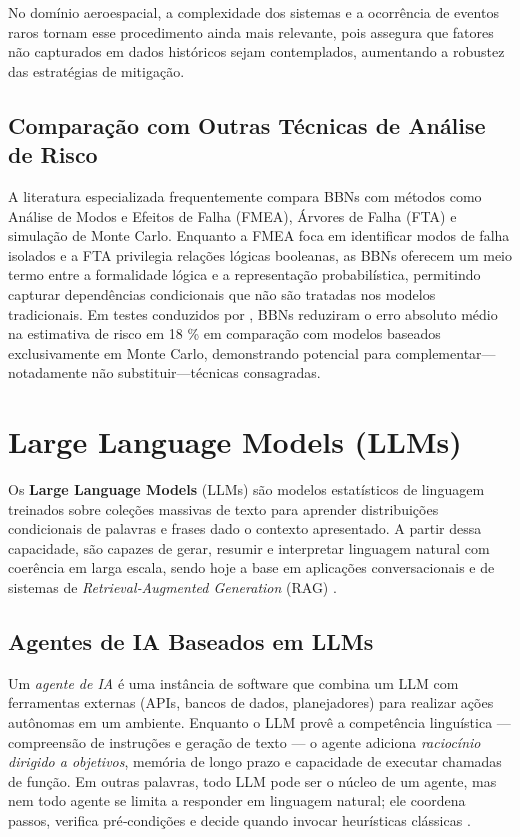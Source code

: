 No domínio aeroespacial, a complexidade dos sistemas e a ocorrência de eventos raros tornam esse procedimento ainda mais relevante, pois assegura que fatores não capturados em dados históricos sejam contemplados, aumentando a robustez das estratégias de mitigação.







\subsection{Comparação com Outras Técnicas de Análise de Risco}
A literatura especializada frequentemente compara BBNs com métodos como Análise de Modos e Efeitos de Falha (FMEA), Árvores de Falha (FTA) e simulação de Monte Carlo. Enquanto a FMEA foca em identificar modos de falha isolados e a FTA privilegia relações lógicas booleanas, as BBNs oferecem um meio termo entre a formalidade lógica e a representação probabilística, permitindo capturar dependências condicionais que não são tratadas nos modelos tradicionais. Em testes conduzidos por \cite{marcot2012future}, BBNs reduziram o erro absoluto médio na estimativa de risco em 18 \% em comparação com modelos baseados exclusivamente em Monte Carlo, demonstrando potencial para complementar—notadamente não substituir—técnicas consagradas.

\section{Large Language Models (LLMs)}
\label{sec:llms}

Os \textbf{Large Language Models} (LLMs) são modelos estatísticos de linguagem treinados sobre coleções massivas de texto para aprender distribuições condicionais de palavras e frases dado o contexto apresentado. A partir dessa capacidade, são capazes de gerar, resumir e interpretar linguagem natural com coerência em larga escala, sendo hoje a base em aplicações conversacionais e de sistemas de \emph{Retrieval‑Augmented Generation} (RAG) \cite{IBM2023LLM}.

\subsection{Agentes de IA Baseados em LLMs}
\label{subsec:agentes_llm}

Um \emph{agente de IA} é uma instância de software que combina um LLM com ferramentas externas (APIs, bancos de dados, planejadores) para realizar ações autônomas em um ambiente. Enquanto o LLM provê a competência linguística — compreensão de instruções e geração de texto — o agente adiciona \emph{raciocínio dirigido a objetivos}, memória de longo prazo e capacidade de executar chamadas de função. Em outras palavras, todo LLM pode ser o núcleo de um agente, mas nem todo agente se limita a responder em linguagem natural; ele coordena passos, verifica pré‑condições e decide quando invocar heurísticas clássicas \cite{IBM2023AGENTES}.

